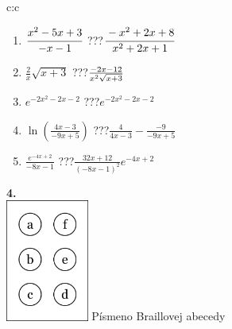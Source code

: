 \documentclass[10pt]{report}
\begin{document}
\begin{tabular}{c:c}
\begin{minipage}[c][104.5mm][t]{0.5\linewidth}
\begin{center}
\begin{minipage}{0.79\linewidth}
\begin{center}
\begin{varwidth}{\linewidth}
\begin{enumerate}
\item $\cfrac{x^2-5x+3}{-x-1}$\quad \dotfill\; ???\;\dotfill \quad $\cfrac{-x^2+2x+8}{x^2+2x+1}$
\item $\frac{2}{x}\sqrt{x+3}$\quad \dotfill\; ???\;\dotfill \quad $\frac{-2x-12}{x^2 \sqrt{\smash[b]{x+3}}}$
\item $e^{-2x^2-2x-2}$\quad \dotfill\; ???\;\dotfill \quad $e^{-2x^2-2x-2}$
\item $\ln{\left(\frac{4x-3}{-9x+5}\right)}$\quad \dotfill\; ???\;\dotfill \quad $\frac{4}{4x-3}-\frac{-9}{-9x+5}$
\item $\frac{e^{-4x+2}}{-8x-1}$\quad \dotfill\; ???\;\dotfill \quad $\frac{32x+12}{(-8x-1)^2}e^{-4x+2}$
\end{enumerate}
\end{varwidth}
\end{center}
\end{minipage}
\begin{minipage}{0.20\linewidth}
\begin{center}
{\Huge\bfseries 4.} \\[2mm]
\includegraphics[height=40mm]{../images/braille.png}
{\small Písmeno Braillovej abecedy}
\end{center}
\end{minipage}
\end{center}
\end{minipage}
%
\end{tabular}
\newpage
\thispagestyle{empty}
\end{document}
